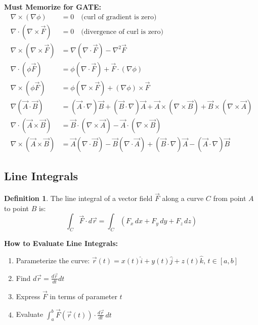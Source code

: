 \documentclass[12pt,a4paper]{article}
\theoremstyle{definition}
\newtheorem{definition}[theorem]{Definition}
\begin{document}
\begin{importantbox}
\textbf{Must Memorize for GATE:}
\begin{align}
\nabla \times (\nabla\phi) &= 0 \quad \text{(curl of gradient is zero)} \\
\nabla \cdot (\nabla \times \vec{F}) &= 0 \quad \text{(divergence of curl is zero)} \\
\nabla \times (\nabla \times \vec{F}) &= \nabla(\nabla \cdot \vec{F}) - \nabla^2\vec{F} \\
\nabla \cdot (\phi\vec{F}) &= \phi(\nabla \cdot \vec{F}) + \vec{F} \cdot (\nabla\phi) \\
\nabla \times (\phi\vec{F}) &= \phi(\nabla \times \vec{F}) + (\nabla\phi) \times \vec{F} \\
\nabla(\vec{A} \cdot \vec{B}) &= (\vec{A} \cdot \nabla)\vec{B} + (\vec{B} \cdot \nabla)\vec{A} + \vec{A} \times (\nabla \times \vec{B}) + \vec{B} \times (\nabla \times \vec{A}) \\
\nabla \cdot (\vec{A} \times \vec{B}) &= \vec{B} \cdot (\nabla \times \vec{A}) - \vec{A} \cdot (\nabla \times \vec{B}) \\
\nabla \times (\vec{A} \times \vec{B}) &= \vec{A}(\nabla \cdot \vec{B}) - \vec{B}(\nabla \cdot \vec{A}) + (\vec{B} \cdot \nabla)\vec{A} - (\vec{A} \cdot \nabla)\vec{B}
\end{align}
\end{importantbox}

\subsection{Line Integrals}

\begin{definition}
The line integral of a vector field $\vec{F}$ along a curve $C$ from point $A$ to point $B$ is:
\[
\int_C \vec{F} \cdot d\vec{r} = \int_C (F_x\,dx + F_y\,dy + F_z\,dz)
\]
\end{definition}

\begin{tipbox}
\textbf{How to Evaluate Line Integrals:}
\begin{enumerate}
    \item Parameterize the curve: $\vec{r}(t) = x(t)\hat{i} + y(t)\hat{j} + z(t)\hat{k}$, $t \in [a,b]$
    \item Find $d\vec{r} = \frac{d\vec{r}}{dt}dt$
    \item Express $\vec{F}$ in terms of parameter $t$
    \item Evaluate $\int_a^b \vec{F}(\vec{r}(t)) \cdot \frac{d\vec{r}}{dt}\,dt$
\end{enumerate}
\end{tipbox}
\end{document}
